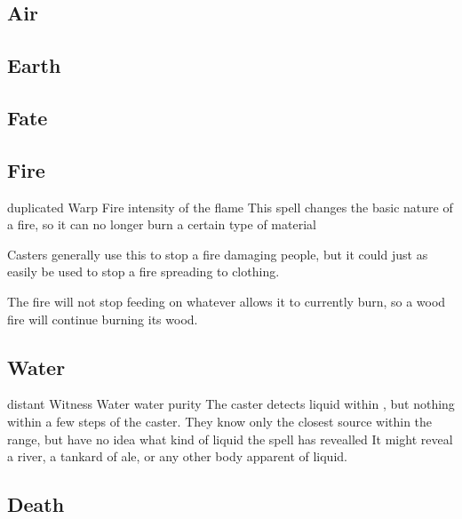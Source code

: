 \begin{multicols}{2}

\subsection{Air}


\subsection{Earth}


\subsection{Fate}


\subsection{Fire}


  {duplicated}%
  {Warp}%
  {Fire}%
  {intensity of the flame}%
  {This spell changes the basic nature of a fire, so it can no longer burn a certain type of material}%
  {Casters generally use this to stop a fire damaging people, but it could just as easily be used to stop a fire spreading to clothing.

    The fire will not stop feeding on whatever allows it to currently burn, so a wood fire will continue burning its wood.}

\subsection{Water}


  {distant}%
  {Witness}%
  {Water}%
  {water purity}%
  {The caster detects liquid within \spellRange, but nothing within a few steps of the caster.
    They know only the closest source within the range, but have no idea what kind of liquid the spell has revealled}%
  {It might reveal a river, a tankard of ale, or any other body apparent of liquid.}

\subsection{Death}


\end{multicols}

